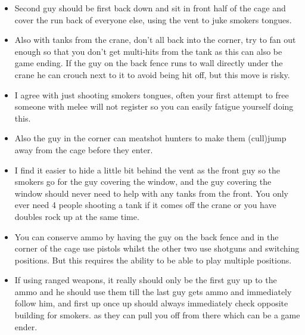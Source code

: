 \begin{itemize}
\item Second guy should be first back down and sit in front half of the cage and cover the run back of everyone else, using the vent to juke smokers tongues.
\item Also with tanks from the crane, don't all back into the corner, try to fan out enough so that you don't get multi-hits from the tank as this can also be game ending. If the guy on the back fence runs to wall directly under the crane he can crouch next to it to avoid being hit off, but this move is risky.
\item I agree with just shooting smokers tongues, often your first attempt to free someone with melee will not register so you can easily fatigue yourself doing this.
\item Also the guy in the corner can meatshot hunters to make them (cull)jump away from the cage before they enter.
 \item I find it easier to hide a little bit behind the vent as the front guy so the smokers go for the guy covering the window, and the guy covering the window should never need to help with any tanks from the front. You only ever need 4 people shooting a tank if it comes off the crane or you have doubles rock up at the same time.
 \item You can conserve ammo by having the guy on the back fence and in the corner of the cage use pistols whilst the other two use shotguns and switching positions. But this requires the ability to be able to play multiple positions.
 \item If using ranged weapons, it really should only be the first guy up to the ammo and he should use them till the last guy gets ammo and immediately follow him, and first up once up should always immediately check opposite building for smokers. as they can pull you off from there which can be a game ender.
\end{itemize}

